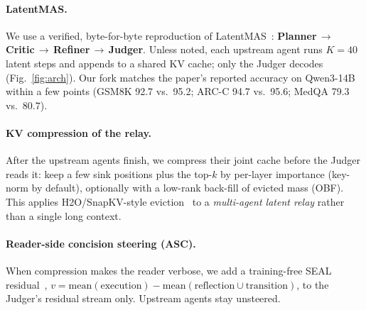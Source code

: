 \documentclass[11pt]{article}
\begin{document}
\paragraph{LatentMAS.} We use a verified, byte-for-byte reproduction of
LatentMAS~\cite{latentmas}:
\textbf{Planner\,$\to$\,Critic\,$\to$\,Refiner\,$\to$\,Judger}. Unless noted,
each upstream agent runs $K{=}40$ latent steps and appends to a shared KV cache;
only the Judger decodes (Fig.~\ref{fig:arch}). Our fork matches the paper's
reported accuracy on Qwen3-14B within a few points (GSM8K 92.7 vs.\ 95.2; ARC-C
94.7 vs.\ 95.6; MedQA 79.3 vs.\ 80.7).

\paragraph{KV compression of the relay.} After the upstream agents finish, we
compress their joint cache before the Judger reads it: keep a few sink positions
plus the top-$k$ by per-layer importance (key-norm by default), optionally with a
low-rank back-fill of evicted mass (OBF). This applies H2O/SnapKV-style
eviction~\cite{h2o,snapkv} to a \emph{multi-agent latent relay} rather than a
single long context.

\paragraph{Reader-side concision steering (ASC).} When compression makes the
reader verbose, we add a training-free SEAL residual~\cite{seal},
$v=\mathrm{mean}(\text{execution})-\mathrm{mean}(\text{reflection}\cup\text{transition})$,
to the Judger's residual stream only. Upstream agents stay unsteered.
\end{document}
